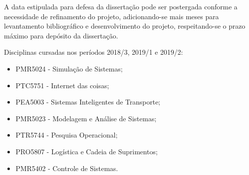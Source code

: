 	A data estipulada para defesa da dissertação pode ser postergada conforme a necessidade de refinamento do projeto, adicionando-se mais meses para levantamento bibliográfico e desenvolvimento do projeto, respeitando-se o prazo máximo para depósito da dissertação. 
	
	Disciplinas cursadas nos períodos 2018/3, 2019/1 e 2019/2:
	\begin{itemize}
		\item PMR5024 - Simulação de Sistemas;
		\item PTC5751 - Internet das coisas;
		\item PEA5003 - Sistemas Inteligentes de Transporte;
		\item PMR5023 - Modelagem e Análise de Sistemas;
		\item PTR5744 - Pesquisa Operacional;
		\item PRO5807 - Logística e Cadeia de Suprimentos;
		\item PMR5402 - Controle de Sistemas.
	\end{itemize}

	
